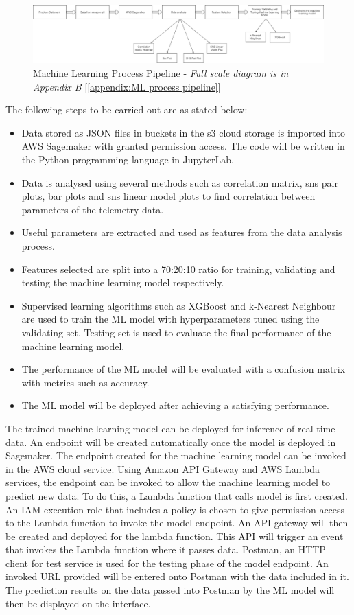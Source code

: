 \begin{figure}[ht]
    \centering
    \includegraphics[width=1\linewidth]{pages/Chapter3/Chapter 3 images/Ml.PNG}
    \caption{Machine Learning Process Pipeline - \textit{Full scale diagram is in Appendix B} 
      [\ref{appendix:ML process pipeline}]}
    \label{Machine Learning Process Pipeline}
\end{figure}

The following steps to be carried out are as stated below:
\begin{itemize}
    \item Data stored as JSON files in buckets in the s3 cloud storage is imported into AWS Sagemaker with granted permission access. The code will be written in the Python programming language in JupyterLab. 
    \item Data is analysed using several methods such as correlation matrix, sns pair plots, bar plots and sns linear model plots to find correlation between parameters of the telemetry data.
    \item Useful parameters are extracted and used as features from the data analysis process. 
    \item Features selected are split into a 70:20:10 ratio for training, validating and testing the machine learning model respectively.
    \item Supervised learning algorithms such as XGBoost and k-Nearest Neighbour are used to train the ML model with hyperparameters tuned using the validating set. Testing set is used to evaluate the final performance of the machine learning model.
     \item The performance of the ML model will be evaluated with a confusion matrix with metrics such as accuracy.
    \item The ML model will be deployed after achieving a satisfying performance.
\end{itemize}

The trained machine learning model can be deployed for inference of real-time data. An endpoint will be created automatically once the model is deployed in Sagemaker. The endpoint created for the machine learning model can be invoked in the AWS cloud service.
Using Amazon API Gateway and AWS Lambda services, the endpoint can be invoked to allow the machine learning model to predict new data. To do this, a Lambda function that calls model is first created. An IAM execution role that includes a policy is chosen to give permission access to the Lambda function to invoke the model endpoint. An API gateway will then be created and deployed for the lambda function. This API will trigger an event that invokes the Lambda function where it passes data. Postman, an HTTP client for test service is used for the testing phase of the model endpoint. An invoked URL provided will be entered onto Postman with the data included in it. The prediction results on the data passed into Postman by the ML model will then be displayed on the interface. 


